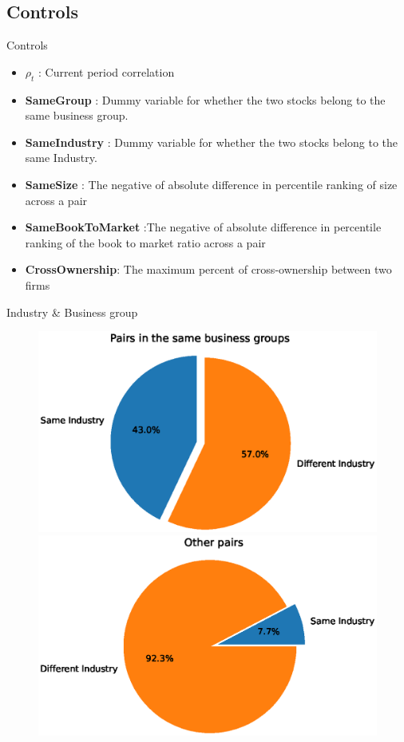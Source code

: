 \documentclass{beamer}
\begin{document}
	\subsection{Controls}
	\begin{frame}{Controls}
		\begin{itemize}
			\item $ \rho_{t} $ : Current period correlation
			
			\item \textbf{SameGroup} : Dummy variable for whether the two stocks belong to the same business group.
			
			
			\item \textbf{SameIndustry} : Dummy variable for whether the two stocks belong to the same Industry.
			
			\item \textbf{SameSize} : The negative of absolute difference in percentile ranking of size across a pair
			
			\item \textbf{SameBookToMarket} :The negative of absolute difference in percentile ranking of the book to market ratio across a pair
			
			\item \textbf{CrossOwnership}: The maximum percent of cross-ownership between two firms
		\end{itemize}
	\end{frame}
	
	
	
	\begin{frame}{Industry \& Business group}
				\begin{table}[htbp]
			\centering \scriptsize
			{
				
			}
		\end{table}
		\begin{figure}[htbp]
			\includegraphics[width=0.45\linewidth]{sameIndustryinBG.eps}
			\includegraphics[width=0.45\linewidth]{sameIndustryNoinBG.eps}
			
		\end{figure}
	\end{frame}
	
\end{document}
